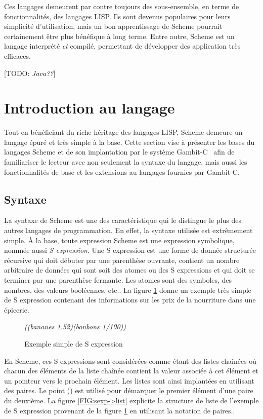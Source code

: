 \documentclass[12pt,oneside,letterpaper,francais]{book}
\newcommand{\todo}[1]{[TODO: {\it #1}]}
\newcommand{\scheme}[1]{\selectlanguage{english}{\tt #1}\selectlanguage{french}}
\newcommand{\schemeresult}[1]{{\it #1}}
\begin{document}
Ces langages demeurent par contre toujours des sous-ensemble, en terme
de fonctionnalités, des langages LISP. Ils sont devenus populaires
pour leurs simplicité d'utilisation, mais un bon apprentissage de
Scheme pourrait certainement être plus bénéfique à long terme. Entre
autre, Scheme est un langage interprété \emph{et} compilé, permettant
de développer des application très efficaces.


\todo{Java??}


\section{Introduction au langage}
Tout en bénéficiant du riche héritage des langages LISP, Scheme
demeure un langage épuré et très simple à la base. Cette section vise
à présenter les bases du langages Scheme et de son implantation par le
système Gambit-C~\cite{Gambit4} afin de familiariser le lecteur avec
non seulement la syntaxe du langage, mais aussi les fonctionnalités de
base et les extensions au langages fournies par Gambit-C.

\subsection{Syntaxe}
La syntaxe de Scheme est une des caractéristique qui le distingue le
plus des autres langages de programmation. En effet, la syntaxe
utilisée est extrêmement simple. À la base, toute expression Scheme
est une expression symbolique, nommée aussi \textit{S expression}. Une
S expression est une forme de donnée structurée récursive qui doit
débuter par une parenthèse ouvrante, contient un nombre arbitraire de
données qui sont soit des atomes ou des S expressions et qui doit se
terminer par une parenthèse fermante. Les atomes sont des symboles,
des nombres, des valeurs booléennes, etc.. La figure \ref{FIG:sexp}
donne un exemple très simple de S expression contenant des
informations sur les prix de la nourriture dans une épicerie.\\

\begin{figure}[htb!]
  \schemeresult{((bananes 1.52)(bonbons 1/100))}
  \caption{Exemple simple de S expression}
  \label{FIG:sexp}
\end{figure}

En Scheme, ces S expressions sont considérées comme étant des listes
chaînées où chacun des éléments de la liste chaînée contient la valeur
associée à cet élément et un pointeur vers le prochain élément. Les
listes sont ainsi implantées en utilisant des paires. Le point
(\scheme{.}) est utilisé pour démarquer le premier élément d'une paire
du deuxième. La figure \ref{FIG:sexp->list} explicite la structure de
liste de l'exemple de S expression provenant de la figure
\ref{FIG:sexp} en utilisant la notation de paires..\\
\end{document}
